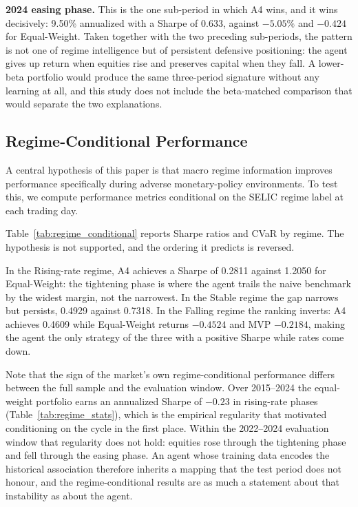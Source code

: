 \textbf{2024 easing phase.}
This is the one sub-period in which A4 wins, and it wins decisively: 9.50\%
annualized with a Sharpe of 0.633, against $-5.05\%$ and $-0.424$ for
Equal-Weight.
Taken together with the two preceding sub-periods, the pattern is not one of
regime intelligence but of persistent defensive positioning: the agent gives up
return when equities rise and preserves capital when they fall.
A lower-beta portfolio would produce the same three-period signature without any
learning at all, and this study does not include the beta-matched comparison that
would separate the two explanations.

\subsection{Regime-Conditional Performance}
\label{subsec:results_regime}

A central hypothesis of this paper is that macro regime information improves
performance specifically during adverse monetary-policy environments.
To test this, we compute performance metrics conditional on the SELIC regime
label at each trading day.

Table~\ref{tab:regime_conditional} reports Sharpe ratios and CVaR by regime.
The hypothesis is not supported, and the ordering it predicts is reversed.

In the Rising-rate regime, A4 achieves a Sharpe of 0.2811 against 1.2050 for
Equal-Weight: the tightening phase is where the agent trails the naive benchmark
by the widest margin, not the narrowest.
In the Stable regime the gap narrows but persists, 0.4929 against 0.7318.
In the Falling regime the ranking inverts: A4 achieves 0.4609 while Equal-Weight
returns $-0.4524$ and MVP $-0.2184$, making the agent the only strategy of the
three with a positive Sharpe while rates come down.

Note that the sign of the market's own regime-conditional performance differs
between the full sample and the evaluation window.
Over 2015--2024 the equal-weight portfolio earns an annualized Sharpe of $-0.23$
in rising-rate phases (Table~\ref{tab:regime_stats}), which is the empirical
regularity that motivated conditioning on the cycle in the first place.
Within the 2022--2024 evaluation window that regularity does not hold: equities
rose through the tightening phase and fell through the easing phase.
An agent whose training data encodes the historical association therefore
inherits a mapping that the test period does not honour, and the regime-conditional
results are as much a statement about that instability as about the agent.

